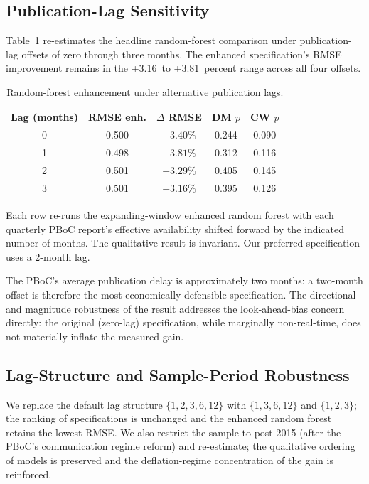 \documentclass[AER]{AEA}
\begin{document}
\subsection{Publication-Lag Sensitivity}
Table~\ref{tab:publag} re-estimates the headline random-forest comparison
under publication-lag offsets of zero through three months. The enhanced
specification's RMSE improvement remains in the +3.16~to +3.81~percent
range across all four offsets.

\begin{table}[tbp]
\caption{Random-forest enhancement under alternative publication lags.\label{tab:publag}}
\centering
\begin{tabular}{ccccc}
\toprule
Lag (months) & RMSE enh. & $\Delta$ RMSE & DM $p$ & CW $p$ \\
\midrule
0 & 0.500 & $+3.40\%$ & 0.244 & 0.090 \\
1 & 0.498 & $+3.81\%$ & 0.312 & 0.116 \\
2 & 0.501 & $+3.29\%$ & 0.405 & 0.145 \\
3 & 0.501 & $+3.16\%$ & 0.395 & 0.126 \\
\bottomrule
\end{tabular}
\begin{tablenotes}
Each row re-runs the expanding-window enhanced random forest with each
quarterly PBoC report's effective availability shifted forward by the
indicated number of months. The qualitative result is invariant. Our
preferred specification uses a 2-month lag.
\end{tablenotes}
\end{table}

The PBoC's average publication delay is approximately two months: a
two-month offset is therefore the most economically defensible
specification. The directional and magnitude robustness of the result
addresses the look-ahead-bias concern directly: the original (zero-lag)
specification, while marginally non-real-time, does not materially inflate
the measured gain.

\subsection{Lag-Structure and Sample-Period Robustness}
We replace the default lag structure $\{1,2,3,6,12\}$ with $\{1,3,6,12\}$
and $\{1,2,3\}$; the ranking of specifications is unchanged and the
enhanced random forest retains the lowest RMSE. We also restrict the
sample to post-2015 (after the PBoC's communication regime reform) and
re-estimate; the qualitative ordering of models is preserved and the
deflation-regime concentration of the gain is reinforced.
\end{document}
